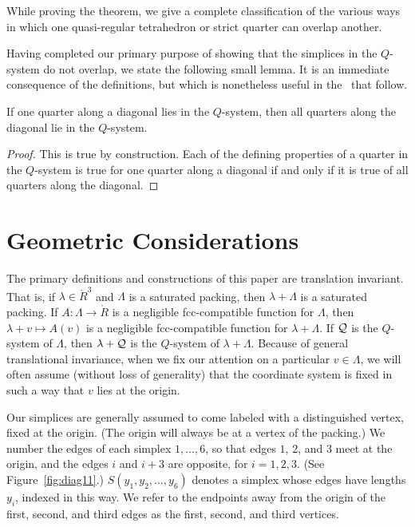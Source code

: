 While proving the theorem, we give a complete classification of
the various ways in which one quasi-regular tetrahedron or strict
quarter can overlap another.

Having completed our primary purpose of showing that the simplices
in the $Q$-system do not overlap, we state the following small
lemma. It is an immediate consequence of the definitions, but
which is nonetheless useful in the \chaps\ that follow.

\begin{lemma} \label{lemma:diags-engulf}
If one quarter along a diagonal lies in the $Q$-system, then all
quarters along the diagonal lie in the $Q$-system.
\end{lemma}

\begin{proof} This is true by construction.  Each of the defining properties
of a quarter in the $Q$-system is true for one quarter along a
diagonal if and only if  it is true of all quarters along the
diagonal.
\end{proof}


\section{Geometric Considerations}
    \label{sec:decomposition}

\begin{remark}  The primary definitions and
constructions of this paper are translation invariant.  That is,
if $\lambda\in\ring{R}^3$ and $\Lambda$ is a saturated packing,
then $\lambda+\Lambda$ is a saturated packing.  If
$A:\Lambda\to\ring{R}$ is a negligible fcc-compatible function for
$\Lambda$, then $\lambda+v\mapsto A(v)$ is a negligible
fcc-compatible function for $\lambda+\Lambda$.  If ${\mathcal Q}$ is the
$Q$-system of $\Lambda$, then $\lambda+{\mathcal Q}$ is the $Q$-system of
$\lambda+\Lambda$. Because of general translational invariance,
when we fix our attention on a particular $v\in\Lambda$, we will
often assume (without loss of generality) that the coordinate
system is fixed in such a way that $v$ lies at the origin.
\end{remark}

Our simplices are generally assumed to come labeled with a
distinguished vertex, fixed  at the origin. (The origin will
always be at a vertex of the packing.) We number the edges of each
simplex $1,\ldots,6$, so that edges $1$, $2$, and $3$ meet at the
origin, and the edges $i$ and $i+3$ are opposite, for $i=1,2,3$.
(See Figure~\ref{fig:diag11}.)  $S(y_1,y_2,\ldots,y_6)$ denotes a
simplex whose edges have lengths $y_i$, indexed in this way. We
refer to the endpoints away from the origin of the first, second,
and third edges as the first, second, and third vertices.
%


